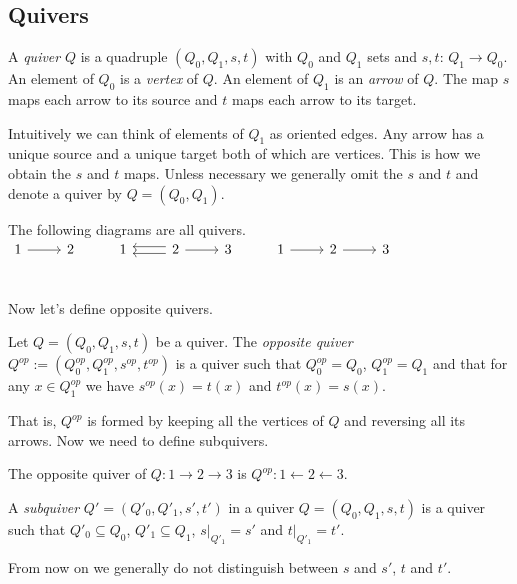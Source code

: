 \subsection{Quivers}
\begin{definition}
A \textit{quiver} $Q$ is a quadruple $(Q_0,Q_1,s,t)$ with $Q_0$ and $Q_1$ sets and $s,t$: $Q_1\rightarrow Q_0$. An element of $Q_0$ is a \textit{vertex} of $Q$. An element of $Q_1$ is an \textit{arrow} of $Q$. The map $s$ maps each arrow to its source and $t$ maps each arrow to its target.
\end{definition}
\indent Intuitively we can think of elements of $Q_1$ as oriented edges. Any arrow has a unique source and a unique target both of which are vertices. This is how we obtain the $s$ and $t$ maps. Unless necessary we generally omit the $s$ and $t$ and denote a quiver by $Q = (Q_0, Q_1)$.\\
\begin{example}
The following diagrams are all quivers.\\
$\begin{tikzcd} 
1 \arrow[r] & 2 & 1 & 2 \arrow[l, shift right]\arrow[l, shift left]\arrow[r] & 3 & 1\arrow[r] & 2\arrow[r] & 3\\
\end{tikzcd}$
\end{example}
\indent Now let's define opposite quivers.\\
\begin{definition}
Let $Q = (Q_0, Q_1, s, t)$ be a quiver. The \textit{opposite quiver} $Q^{op}:=(Q^{op}_0, Q^{op}_1, s^{op}, t^{op})$ is a quiver such that $Q^{op}_0 = Q_0$, $Q^{op}_1 = Q_1$ and that for any $x\in Q^{op}_1$ we have $s^{op}(x) = t(x)$ and $t^{op}(x) = s(x)$.
\end{definition}
\indent That is, $Q^{op}$ is formed by keeping all the vertices of $Q$ and reversing all its arrows. Now we need to define subquivers.\\
\begin{example}
The opposite quiver of $Q: 1\to 2\to 3$ is $Q^{op}:1 \leftarrow 2\leftarrow 3$.
\end{example}
\begin{definition}
A \textit{subquiver} $Q' = (Q'_0,Q'_1, s', t')$ in a quiver $Q = (Q_0,Q_1, s, t)$ is a quiver such that $Q'_0\subseteq Q_0$, $Q'_1\subseteq Q_1$, $s|_{Q'_1} = s'$ and $t|_{Q'_1} = t'$.
\end{definition}
\indent From now on we generally do not distinguish between $s$ and $s'$, $t$ and $t'$.\\

